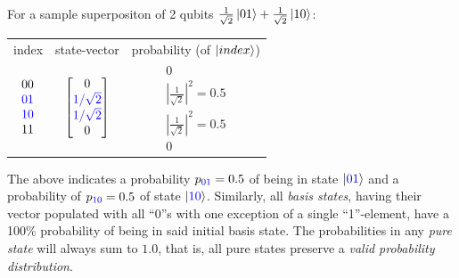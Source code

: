 \documentclass[conference]{IEEEtran}
\begin{document}
For a sample superpositon of 2 qubits $\frac{1}{\sqrt{2}}\ket{01} + \frac{1}{\sqrt{2}}\ket{10}$:
\begin{center}
    \begin{tabular}{c c c}

        index & state-vector & probability (of $\ket{index}$) \\
        $
        \begin{matrix}
            00 \\
            \textcolor{blue}{01} \\
            \textcolor{blue}{10} \\
            11 \\
        \end{matrix}
        $
        &
        $
        \begin{bmatrix}
            0 \\
            \textcolor{blue}{1/\sqrt{2}} \\
            \textcolor{blue}{1/\sqrt{2}} \\
            0 \\
        \end{bmatrix}
        $
        &
        $
        \begin{matrix}
        0 \\
        |\frac{1}{\sqrt{2}}|^2 = 0.5 \\
        |\frac{1}{\sqrt{2}}|^2 = 0.5 \\
        0
        \end{matrix}
        $
        \\

    \end{tabular}
\end{center}

The above indicates a probability $p_{\textcolor{blue}{01}}=0.5$ of being in state $\ket{\textcolor{blue}{01}}$ and a probability of $p_{\textcolor{blue}{10}}=0.5$ of state $\ket{\textcolor{blue}{10}}$.
Similarly, all \textit{basis states}, having their vector populated with all ``0''s with one exception of a single ``1''-element,
have a 100\% probability of being in said initial basis state.
The probabilities in any \textit{pure state} will always sum to $1.0$, that is, all pure states preserve a \textit{valid probability distribution}.
\end{document}
